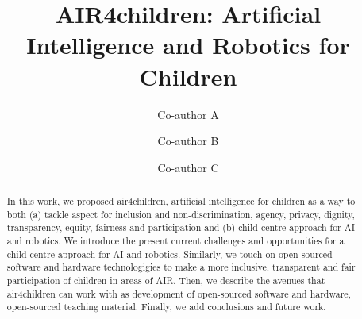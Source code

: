 \documentclass[sigconf]{acmart}
\begin{document}
\title{AIR4children: Artificial Intelligence and Robotics for Children}


\author{Co-author A}

\author{Co-author B}

\author{Co-author C}
\authornotemark[1]

\renewcommand{\shortauthors}{Lastname et al.}

\begin{abstract}
  In this work, we proposed air4children, artificial intelligence for children as a way to both (a) tackle aspect for inclusion and non-discrimination, agency, privacy, dignity, transparency, equity, fairness and participation and (b) child-centre approach for AI and robotics.
  We introduce the present current challenges and opportunities for a child-centre approach for AI and robotics. 
  Similarly, we touch on open-sourced software and hardware technologigies to make a more inclusive, transparent and fair participation of children in areas of AIR. 
  Then, we describe the avenues that air4children can work with as development of open-sourced software and hardware, open-sourced teaching material. 
  Finally, we add conclusions and future work. 
\end{abstract}
\end{document}
